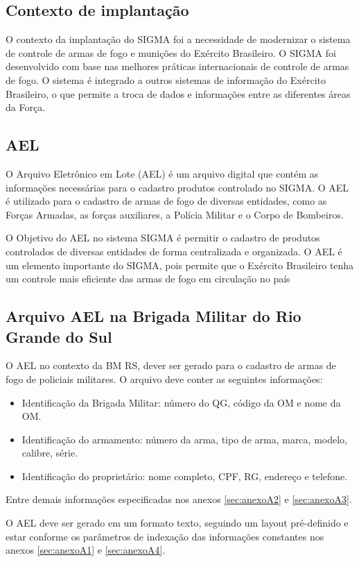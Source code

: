 \subsection{Contexto de implantação}
O contexto da implantação do SIGMA foi a necessidade de modernizar o sistema de controle de armas de fogo e munições do Exército Brasileiro.
O SIGMA foi desenvolvido com base nas melhores práticas internacionais de controle de armas de fogo. O sistema é integrado a outros sistemas de informação do Exército Brasileiro, o que permite a troca de dados e informações entre as diferentes áreas da Força.\cite{fenemeReunixE3oSobre}

\subsection{AEL}
O Arquivo Eletrônico em Lote (AEL) é um arquivo digital que contém as informações necessárias para o cadastro produtos controlado no SIGMA.
O AEL é utilizado para o cadastro de armas de fogo de diversas entidades, como as Forças Armadas, as forças auxiliares, a Polícia Militar e o Corpo de Bombeiros.\cite{ExércitoBrasileiro}

O Objetivo do AEL no sistema SIGMA é permitir o cadastro de produtos controlados de diversas entidades de forma centralizada e organizada. O AEL é um elemento importante do SIGMA, pois permite que o Exército Brasileiro tenha um controle mais eficiente das armas de fogo em circulação no país\cite{ExércitoBrasileiro}

\subsection{Arquivo AEL na Brigada Militar do Rio Grande do Sul}
O AEL no contexto da BM RS, dever ser gerado para o cadastro de armas de fogo de policiais militares. O arquivo deve conter as seguintes informações:
\begin{itemize}
    \item Identificação da Brigada Militar: número do QG, código da OM e nome da OM.
    \item Identificação do armamento: número da arma, tipo de arma, marca, modelo, calibre, série.
    \item Identificação do proprietário: nome completo, CPF, RG, endereço e telefone.
\end{itemize}
Entre demais informações especificadas nos anexos \ref{sec:anexoA2} e \ref{sec:anexoA3}.

O AEL deve ser gerado em um formato texto, seguindo um layout pré-definido e estar conforme os parâmetros de indexação das informações constantes nos anexos \ref{sec:anexoA1} e \ref{sec:anexoA4}.

